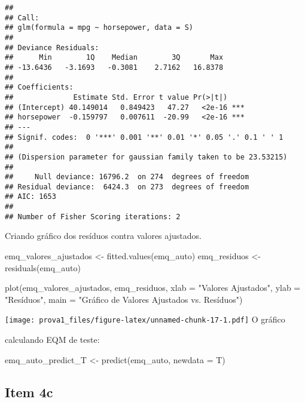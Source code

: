 \documentclass[
]{article}
\newenvironment{Shaded}{\begin{snugshade}}{\end{snugshade}}
\newcommand{\AttributeTok}[1]{\textcolor[rgb]{0.77,0.63,0.00}{#1}}
\newcommand{\FunctionTok}[1]{\textcolor[rgb]{0.00,0.00,0.00}{#1}}
\newcommand{\NormalTok}[1]{#1}
\newcommand{\OtherTok}[1]{\textcolor[rgb]{0.56,0.35,0.01}{#1}}
\newcommand{\StringTok}[1]{\textcolor[rgb]{0.31,0.60,0.02}{#1}}
\begin{document}
\begin{verbatim}
## 
## Call:
## glm(formula = mpg ~ horsepower, data = S)
## 
## Deviance Residuals: 
##      Min        1Q    Median        3Q       Max  
## -13.6436   -3.1693   -0.3081    2.7162   16.8378  
## 
## Coefficients:
##              Estimate Std. Error t value Pr(>|t|)    
## (Intercept) 40.149014   0.849423   47.27   <2e-16 ***
## horsepower  -0.159797   0.007611  -20.99   <2e-16 ***
## ---
## Signif. codes:  0 '***' 0.001 '**' 0.01 '*' 0.05 '.' 0.1 ' ' 1
## 
## (Dispersion parameter for gaussian family taken to be 23.53215)
## 
##     Null deviance: 16796.2  on 274  degrees of freedom
## Residual deviance:  6424.3  on 273  degrees of freedom
## AIC: 1653
## 
## Number of Fisher Scoring iterations: 2
\end{verbatim}

Criando gráfico dos resíduos contra valores ajustados.

\begin{Shaded}
\begin{Highlighting}[]
\NormalTok{emq\_valores\_ajustados }\OtherTok{\textless{}{-}} \FunctionTok{fitted.values}\NormalTok{(emq\_auto)}
\NormalTok{emq\_residuos }\OtherTok{\textless{}{-}} \FunctionTok{residuals}\NormalTok{(emq\_auto)}

\FunctionTok{plot}\NormalTok{(emq\_valores\_ajustados, emq\_residuos, }
     \AttributeTok{xlab =} \StringTok{"Valores Ajustados"}\NormalTok{, }
     \AttributeTok{ylab =} \StringTok{"Resíduos"}\NormalTok{,}
     \AttributeTok{main =} \StringTok{"Gráfico de Valores Ajustados vs. Resíduos"}\NormalTok{)}
\end{Highlighting}
\end{Shaded}

\texttt{[image: prova1\_files/figure-latex/unnamed-chunk-17-1.pdf]} O
gráfico

calculando EQM de teste:

\begin{Shaded}
\begin{Highlighting}[]
\NormalTok{emq\_auto\_predict\_T }\OtherTok{\textless{}{-}} \FunctionTok{predict}\NormalTok{(emq\_auto, }\AttributeTok{newdata =}\NormalTok{ T)}
\end{Highlighting}
\end{Shaded}

\hypertarget{item-4c}{%
\subsection{Item 4c}\label{item-4c}}
\end{document}
